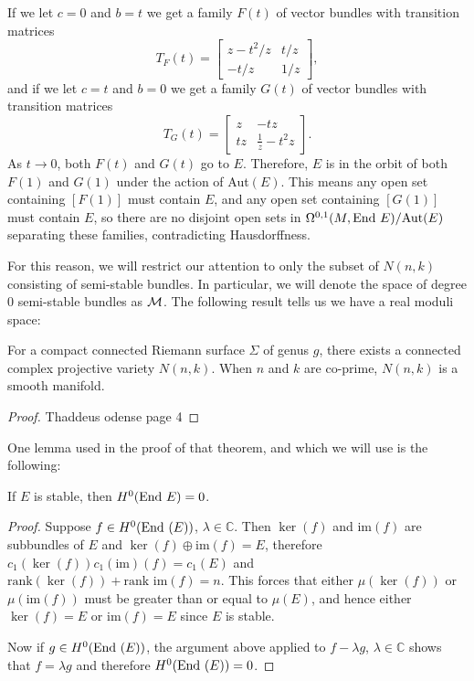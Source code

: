 	If we let $c=0$ and $b=t$ we get a family $F(t)$ of vector bundles with transition matrices
	\begin{equation*}
	T_{F}(t) = \begin{bmatrix}
	z-t^2/z & t/z\\
	-t/z & 1/z
	\end{bmatrix},
	\end{equation*}
	and if we let $c=t$ and $b=0$ we get a family $G(t)$ of vector bundles with transition matrices
	\begin{equation*}
	T_{G}(t) = \begin{bmatrix}
	z & -tz\\
	tz & \frac{1}{z}-t^2 z
	\end{bmatrix}.
	\end{equation*}
	As $t\to 0$, both $F(t)$ and $G(t)$ go to $E$. Therefore, $E$ is in the orbit of both $F(1)$ and $G(1)$ under the action of Aut$(E)$. This means any open set containing $[F(1)]$ must contain $E$, and any open set containing $[G(1)]$ must contain $E$, so there are no disjoint open sets in $\Omega^{0,1}(M,\text{End } E)/\text{Aut}(E)$ separating these families, contradicting Hausdorffness.
	
	For this reason, we will restrict our attention to only the subset of $N(n,k)$ consisting of semi-stable bundles. In particular, we will denote the space of degree $0$ semi-stable bundles as $\mathcal{M}$. The following result tells us we have a real moduli space:
	
	\begin{theorem}
		For a compact connected Riemann surface $\Sigma$ of genus $g$, there exists a connected complex projective variety $N(n,k)$. When $n$ and $k$ are co-prime, $N(n,k)$ is a smooth manifold. 
	\end{theorem}
	\begin{proof}
		Thaddeus odense page 4
	\end{proof}

	One lemma used in the proof of that theorem, and which we will use is the following:
	\begin{lemma}
		If $E$ is stable, then $H^0(\text{End } E) = 0$.
		\label{l:stablesimple}
	\end{lemma}
	\begin{proof}
		Suppose $f\in H^0(\text{End }(E))$, $\lambda \in \mathbb{C}$. Then $\ker(f)$ and im$(f)$ are subbundles of $E$ and $\ker(f)\oplus\text{im}(f) = E$, therefore $c_1(\ker(f))c_1(\text{im})(f) = c_1(E)$ and $\text{rank}(\ker(f)) + \text{rank im}(f) = n$. This forces that either $\mu(\ker(f))$ or $\mu(\text{im}(f))$ must be greater than or equal to $\mu(E)$, and hence either $\ker(f) = E$ or $\text{im}(f)=E$ since $E$ is stable.
		
		Now if $g\in H^0(\text{End }(E))$, the argument above applied to $f-\lambda g$, $\lambda \in \mathbb{C}$ shows that $f = \lambda g$ and therefore $H^0(\text{End }(E)) =0$.
	\end{proof}

